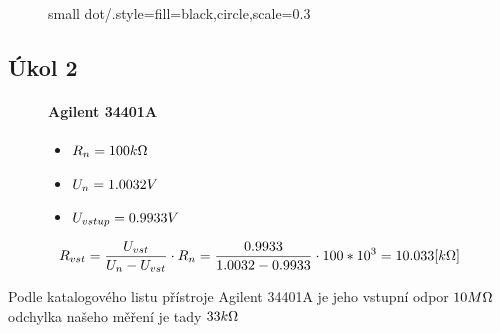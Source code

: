 \documentclass{article}
\begin{document}
\begin{figure}[H]
\begin{minipage}[t]{0.4\textwidth}
{        small dot/.style={fill=black,circle,scale=0.3}
        }
    \end{minipage}
\end{figure}

\newpage
\subsection{Úkol 2}

\begin{figure}[H]
    \begin{minipage}[t]{0.3\textwidth}
        \paragraph{Agilent 34401A}
        \begin{itemize}
            \item \(R_n = 100\-k\Omega\) 
            \item \(U_n = 1.0032\-V\) 
            \item \(U_{vstup} = 0.9933\-V\) 
        \end{itemize}
    \end{minipage}
    \hfill
    \begin{minipage}[t]{0.7\textwidth}
        \vspace{5mm}
        \begin{equation}
            R_{vst} = \frac{U_{vst}}{U_{n}-U_{vst}}\cdot R_n = \frac{0.9933}{1.0032-0.9933}\cdot 100*10^3 = 10.033\-[k\Omega]  
        \end{equation}
    \end{minipage}
\end{figure}
Podle katalogového listu přístroje Agilent 34401A je jeho vstupní odpor \(10\-M\Omega \)\\odchylka našeho měření je tady \(33\-k\Omega\)
\end{document}
